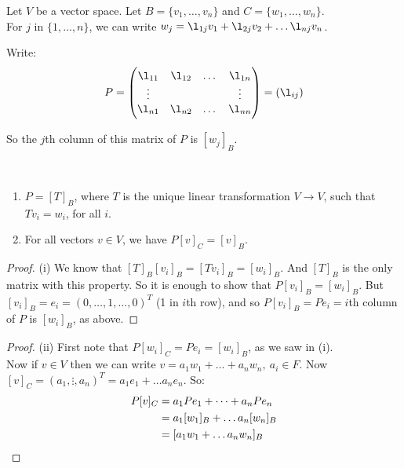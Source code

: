 \documentclass[10pt]{scrartcl}
\begin{document}
 

 Let    
 $V$ be a vector space. Let $B = \{v_1,\dots,v_n\}$ and $C = \{w_1,\dots,w_n\}$. \\
 For $j$ in $\{1, \dots,n\}$, we can write $w_j = \l_{1j}v_1 + \l_{2j}v_2 + \dots \l_{nj}v_n $.
 
 Write:\[
 P =
 \begin{pmatrix}
 \l_{11} & \l_{12} & \dots & \l_{1n}\\
 \vdots & &  & \vdots \\
 \l_{n1} & \l_{n2} & \dots & \l_{nn}
 \end{pmatrix} = (\l_{ij})
 \]
 
 So the $j$th column of this matrix of $P$ is $[w_j]_B$.\\
 
\begin{proposition}~ \begin{enumerate}
 \item[(i)] $P = [T]_B$, where $T$ is the unique linear transformation $V \to V$, such that $Tv_i = w_i$, for all $i$.
 \item[(ii)] For all vectors $v \in V$, we have $P[v]_C = [v]_B$. 
 
 \end{enumerate}
 \end{proposition}

\begin{proof} (i)
We know that $[T]_B[v_i]_B = [Tv_i]_B = [w_i]_B$. And  $[T]_B$ is the only matrix with this property. So it is enough to show that $P[v_i]_B = [w_i]_B$. But $[v_i]_B = e_i = (0,\dots,1,\dots,0)^T$ (1 in $i$th row), and so $P[v_i]_B =  Pe_i = i$th column of $P$ is $[w_i]_B$, as above.
\end{proof}

\begin{proof} (ii)
First note that $P[w_i]_C = Pe_i = [w_i]_B$, as we saw in (i). \\

Now if $v \in V$ then we can write $v = a_1w_1 + \dots + a_nw_n, ~a_i \in F.$ Now $[v]_C = (a_1,\vdots,a_n)^T = a_1e_1 + \dots a_ne_n$. So:
\[
 \begin{aligned}P[v]_C &= a_1Pe_1 + \dots + a_nPe_n\\
 & = a_1[w_1]_B + \dots a_n[w_n]_B \\
 &= [a_1w_1 + \dots a_nw_n]_B\qedhere
 \end{aligned}
\]
\end{proof}\vspace*{5pt}
\end{document}
